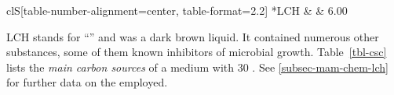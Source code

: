\begin{table}
\begin{threeparttable}
\begin{tabular}{clS[table-number-alignment=center, table-format=2.2]}
			*{LCH} & \xyl{} & 6.00 \\
			\bottomrule
		\end{tabular}
		\begin{tablenotes}
			\item\label{tnote:lch} LCH stands for \enquote{\lch{}} and was a dark brown liquid. It contained numerous other substances, some of them known inhibitors of microbial growth. Table~\ref{tbl-csc} lists the \textit{main carbon sources} of a medium with \SI{30}{\volpercent} \lch{}. See \vref{subsec-mam-chem-lch} for further data on the \lch{} employed.
		\end{tablenotes}
	\end{threeparttable}
\end{table}

